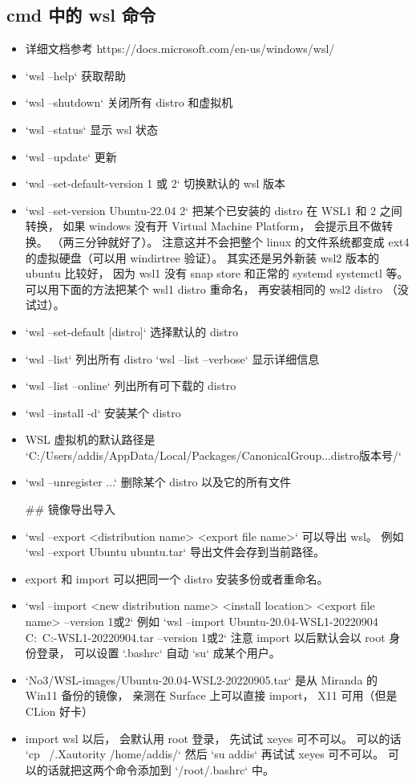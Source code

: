 
\begin{issues}
\issueDraft
\end{issues}

\subsection{cmd 中的 wsl 命令}
\begin{itemize}
\item 详细文档参考 https://docs.microsoft.com/en-us/windows/wsl/
\item `wsl --help` 获取帮助
\item `wsl --shutdown` 关闭所有 distro 和虚拟机
\item `wsl --status` 显示 wsl 状态
\item `wsl --update` 更新
\item `wsl --set-default-version 1 或 2` 切换默认的 wsl 版本
\item `wsl --set-version Ubuntu-22.04 2` 把某个已安装的 distro 在 WSL1 和 2 之间转换， 如果 windows 没有开 Virtual Machine Platform， 会提示且不做转换。 （两三分钟就好了）。 注意这并不会把整个 linux 的文件系统都变成 ext4 的虚拟硬盘（可以用 windirtree 验证）。 其实还是另外新装 wsl2 版本的 ubuntu 比较好， 因为 wsl1 没有 snap store 和正常的 systemd systemctl 等。 可以用下面的方法把某个 wsl1 distro 重命名， 再安装相同的 wsl2 distro （没试过）。
\item `wsl --set-default [distro]` 选择默认的 distro
\item `wsl --list` 列出所有 distro `wsl --list --verbose` 显示详细信息
\item `wsl --list --online` 列出所有可下载的 distro
\item `wsl --install -d` 安装某个 distro
\item WSL 虚拟机的默认路径是 `C:/Users/addis/AppData/Local/Packages/CanonicalGroup...distro版本号/`
\item `wsl --unregister ...` 删除某个 distro 以及它的所有文件

## 镜像导出导入
\item `wsl --export <distribution name> <export file name>` 可以导出 wsl。 例如 `wsl --export Ubuntu ubuntu.tar` 导出文件会存到当前路径。
\item export 和 import 可以把同一个 distro 安装多份或者重命名。
\item `wsl --import <new distribution name> <install location> <export file name> --version 1或2` 例如 `wsl --import Ubuntu-20.04-WSL1-20220904 C:\Users\addis\ C:\Users\addis\Desktop{}-WSL1-20220904.tar --version 1或2` 注意 import 以后默认会以 root 身份登录， 可以设置 `.bashrc` 自动 `su` 成某个用户。
\item `No3/WSL-images/Ubuntu-20.04-WSL2-20220905.tar` 是从 Miranda 的 Win11 备份的镜像， 亲测在 Surface 上可以直接 import， X11 可用（但是 CLion 好卡）
\item import wsl 以后， 会默认用 root 登录， 先试试 xeyes 可不可以。 可以的话 `cp ~/.Xautority /home/addis/` 然后 `su addis` 再试试 xeyes 可不可以。 可以的话就把这两个命令添加到 `/root/.bashrc` 中。
\end{itemize}
